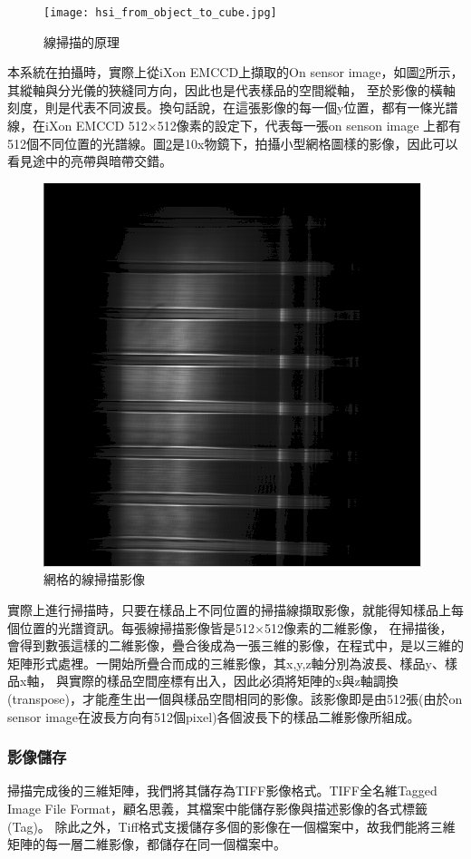 \documentclass[12pt]{article}
\begin{document}
\begin{figure}[t]
    \centering
    \texttt{[image: hsi\_from\_object\_to\_cube.jpg]}
    \caption{線掃描的原理}
    \label{figure: lineScan}
\end{figure}

本系統在拍攝時，實際上從iXon EMCCD上擷取的On sensor image，如圖\ref{figure: linespectrum}所示，其縱軸與分光儀的狹縫同方向，因此也是代表樣品的空間縱軸，
至於影像的橫軸刻度，則是代表不同波長。換句話說，在這張影像的每一個y位置，都有一條光譜線，在iXon EMCCD 512$\times$512像素的設定下，代表每一張on senson image
上都有512個不同位置的光譜線。圖\ref{figure: linespectrum}是10x物鏡下，拍攝小型網格圖樣的影像，因此可以看見途中的亮帶與暗帶交錯。

\begin{figure}[t]
    \centering
    \includegraphics[width=0.5\linewidth]{lineSpectrum1213LDLS.png}
    \caption{網格的線掃描影像}
    \label{figure: linespectrum}
\end{figure}

實際上進行掃描時，只要在樣品上不同位置的掃描線擷取影像，就能得知樣品上每個位置的光譜資訊。每張線掃描影像皆是512$\times$512像素的二維影像，
在掃描後，會得到數張這樣的二維影像，疊合後成為一張三維的影像，在程式中，是以三維的矩陣形式處裡。一開始所疊合而成的三維影像，其x,y,z軸分別為波長、樣品y、樣品x軸，
與實際的樣品空間座標有出入，因此必須將矩陣的x與z軸調換(transpose)，才能產生出一個與樣品空間相同的影像。該影像即是由512張(由於on sensor image在波長方向有512個pixel)各個波長下的樣品二維影像所組成。

\subsubsection{影像儲存}\label{section: saveTiff}
掃描完成後的三維矩陣，我們將其儲存為TIFF影像格式。TIFF全名維Tagged Image File Format，顧名思義，其檔案中能儲存影像與描述影像的各式標籤(Tag)。
除此之外，Tiff格式支援儲存多個的影像在一個檔案中，故我們能將三維矩陣的每一層二維影像，都儲存在同一個檔案中。
\end{document}
